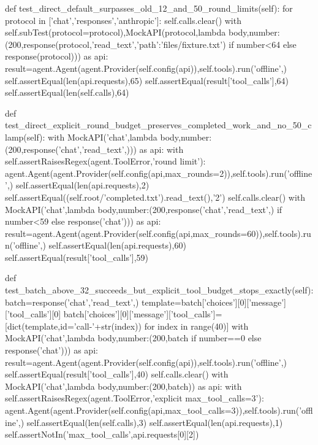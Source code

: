     def test_direct_default_surpasses_old_12_and_50_round_limits(self):
        for protocol in ['chat','responses','anthropic']:
            self.calls.clear()
            with self.subTest(protocol=protocol),MockAPI(protocol,lambda body,number:(200,response(protocol,'read_text',{'path':'files/fixture.txt'}) if number<64 else response(protocol))) as api:
                result=agent.Agent(agent.Provider(self.config(api)),self.tools).run('offline',{})
                self.assertEqual(len(api.requests),65)
                self.assertEqual(result['tool_calls'],64)
                self.assertEqual(len(self.calls),64)

    def test_direct_explicit_round_budget_preserves_completed_work_and_no_50_clamp(self):
        with MockAPI('chat',lambda body,number:(200,response('chat','read_text',{}))) as api:
            with self.assertRaisesRegex(agent.ToolError,'round limit'):
                agent.Agent(agent.Provider(self.config(api,max_rounds=2)),self.tools).run('offline',{})
            self.assertEqual(len(api.requests),2)
            self.assertEqual((self.root/'completed.txt').read_text(),'2')
        self.calls.clear()
        with MockAPI('chat',lambda body,number:(200,response('chat','read_text',{}) if number<59 else response('chat'))) as api:
            result=agent.Agent(agent.Provider(self.config(api,max_rounds=60)),self.tools).run('offline',{})
            self.assertEqual(len(api.requests),60)
            self.assertEqual(result['tool_calls'],59)

    def test_batch_above_32_succeeds_but_explicit_tool_budget_stops_exactly(self):
        batch=response('chat','read_text',{})
        template=batch['choices'][0]['message']['tool_calls'][0]
        batch['choices'][0]['message']['tool_calls']=[dict(template,id='call-'+str(index)) for index in range(40)]
        with MockAPI('chat',lambda body,number:(200,batch if number==0 else response('chat'))) as api:
            result=agent.Agent(agent.Provider(self.config(api)),self.tools).run('offline',{})
            self.assertEqual(result['tool_calls'],40)
        self.calls.clear()
        with MockAPI('chat',lambda body,number:(200,batch)) as api:
            with self.assertRaisesRegex(agent.ToolError,'explicit max_tool_calls=3'):
                agent.Agent(agent.Provider(self.config(api,max_tool_calls=3)),self.tools).run('offline',{})
            self.assertEqual(len(self.calls),3)
            self.assertEqual(len(api.requests),1)
            self.assertNotIn('max_tool_calls',api.requests[0][2])

